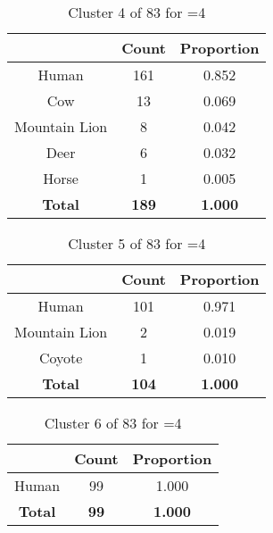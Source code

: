 \begin{table}[ht!]
\centering
\begin{tabular}{|c|c|c|}
\hline
\bf \Spec{} &\bf Count &\bf Proportion\\ \hline \hline
Human & 161 & 0.852\\ \hline
Cow & 13 & 0.069\\ \hline
Mountain Lion & 8 & 0.042\\ \hline
Deer & 6 & 0.032\\ \hline
Horse & 1 & 0.005\\ \hline
\hline
\bf Total & \bf 189 & \bf 1.000\\ \hline
\end{tabular}
\label{tab:cluster:4:4}
\caption{Cluster 4 of 83 for \minneigh{}=4}
\end{table}

\begin{table}[ht!]
\centering
\begin{tabular}{|c|c|c|}
\hline
\bf \Spec{} &\bf Count &\bf Proportion\\ \hline \hline
Human & 101 & 0.971\\ \hline
Mountain Lion & 2 & 0.019\\ \hline
Coyote & 1 & 0.010\\ \hline
\hline
\bf Total & \bf 104 & \bf 1.000\\ \hline
\end{tabular}
\label{tab:cluster:5:4}
\caption{Cluster 5 of 83 for \minneigh{}=4}
\end{table}

\begin{table}[ht!]
\centering
\begin{tabular}{|c|c|c|}
\hline
\bf \Spec{} &\bf Count &\bf Proportion\\ \hline \hline
Human & 99 & 1.000\\ \hline
\hline
\bf Total & \bf 99 & \bf 1.000\\ \hline
\end{tabular}
\label{tab:cluster:6:4}
\caption{Cluster 6 of 83 for \minneigh{}=4}
\end{table}


